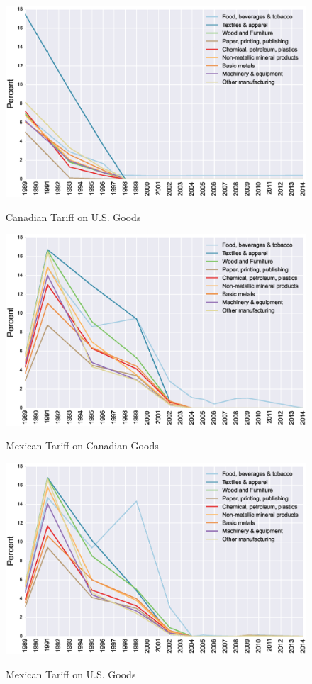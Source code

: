 \begin{figure}[!ht]\centering
\caption{Canadian Tariff on U.S. Goods}
\includegraphics[scale=0.5]{tau_can_usa}
\label{fig:can_usa}
\end{figure}

\newpage
\vfill

\begin{figure}[h!t]\centering
\caption{\small Mexican Tariff on Canadian Goods}
\includegraphics[scale=0.5]{tau_mex_can}
\label{fig:mex_can}
\end{figure}

\begin{figure}[h!t]\centering
\caption{\small Mexican Tariff on U.S. Goods}
\includegraphics[scale=0.5]{tau_mex_usa}
\label{fig:mex_usa}
\end{figure}

